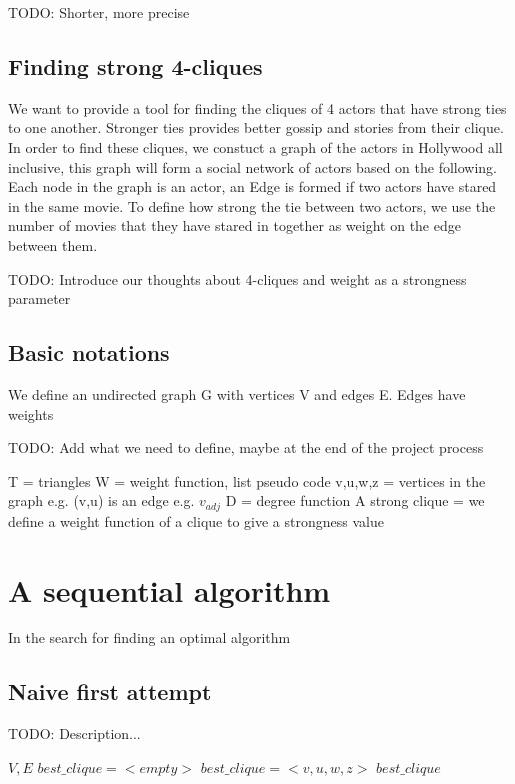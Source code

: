 \documentclass{article}
\begin{document}
TODO: Shorter, more precise


\subsection{Finding strong 4-cliques}
\noindent We want to provide a tool for finding the cliques of 4 actors that have strong ties to one another. Stronger ties provides better gossip and stories from their clique. In order to find these cliques, we constuct a graph of the actors in Hollywood all inclusive, this graph will form a social network of actors based on the following.
Each node in the graph is an actor, an Edge is formed if two actors have stared in the same movie. To define how strong the tie between two actors, we use the number of movies that they have stared in together as weight on the edge between them.

TODO: Introduce our thoughts about 4-cliques and weight as a strongness parameter

\subsection{Basic notations}
We define an undirected graph G with vertices V and edges E.
Edges have weights

TODO: Add what we need to define, maybe at the end of the project process

T = triangles
W = weight function, list pseudo code
v,u,w,z = vertices in the graph
e.g. (v,u) is an edge
e.g. $v_{adj}$
D = degree function
A strong clique = we define a weight function of a clique to give a strongness value


\section{A sequential algorithm}
In the search for finding an optimal algorithm

\subsection{Naive first attempt}
TODO: Description...

\begin{algorithm}
\caption{$4clique\_iterator$}
\begin{algorithmic}
\REQUIRE $V,E$
\STATE $best\_clique = <empty>$
\STATE $best\_clique = <v,u,w,z>$
\ENDIF
\ENDIF
\ENDFOR
\ENDIF
\ENDFOR
\ENDFOR
\ENDFOR
\RETURN $best\_clique$
\end{algorithmic}
\end{algorithm}
\end{document}
